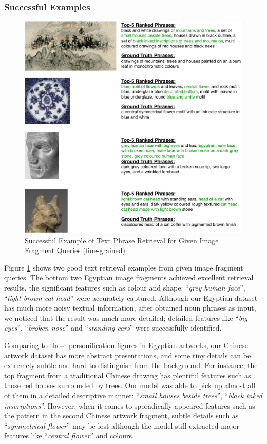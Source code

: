\subsubsection{Successful Examples}

\begin{figure}[h!]
\centering
\includegraphics[width=\textwidth]{i2t.pdf}
\caption{Successful Example of Text Phrase Retrieval for Given Image Fragment Queries (fine-grained)}
\label{fig:i2t}
\end{figure}
Figure \ref{fig:i2t} shows two good text retrieval examples from given image fragment queries. The bottom two Egyptian image fragments achieved excellent retrieval results, the significant features such as colour and shape: ``\textit{grey human face}'', ``\textit{light brown cat head}'' were accurately captured. Although our Egyptian dataset has much more noisy textual information, after obtained noun phrases as input, we noticed that the result was much more detailed; detailed features like ``\textit{big eyes}'', ``\textit{broken nose}'' and ``\textit{standing ears}'' were successfully identified. 

Comparing to those personification figures in Egyptian artworks, our Chinese artwork dataset has more abstract presentations, and some tiny details can be extremely subtle and hard to distinguish from the background. For instance, the top fragment from a traditional Chinese drawing has plentiful features such as those red houses surrounded by trees. Our model was able to pick up almost all of them in a detailed descriptive manner: ``\textit{small houses beside trees}'', ``\textit{black inked inscriptions}''. However, when it comes to sporadically appeared features such as the pattern in the second Chinese artwork fragment, subtle details such as ``\textit{symmetrical flower}'' may be lost although the model still extracted major features like ``\textit{central flower}'' and colours.

